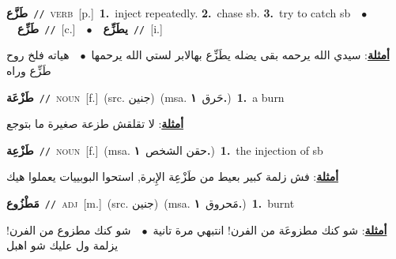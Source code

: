\documentclass[10pt,a4paper,twoside]{article} %
\begin{document}
\begin{multicols}{2}
{\setlength\topsep{0pt}\textbf{\foreignlanguage{arabic}{طَزَّع}}\ {\color{gray}\texttt{//}\color{black}}\ \textsc{verb}\ [p.]\ \textbf{1.}~inject repeatedly.  \textbf{2.}~chase sb.  \textbf{3.}~try to catch sb\ \ $\bullet$\ \ \setlength\topsep{0pt}\textbf{\foreignlanguage{arabic}{طَزِّع}}\ {\color{gray}\texttt{//}\color{black}}\ [c.]\ \ $\bullet$\ \ \setlength\topsep{0pt}\textbf{\foreignlanguage{arabic}{يطَزِّع}}\ {\color{gray}\texttt{//}\color{black}}\ [i.]\  \begin{flushright}\color{gray}\foreignlanguage{arabic}{\textbf{\underline{\foreignlanguage{arabic}{أمثلة}}}: سيدي الله يرحمه بقى يضله يطَزِّع بهالابر لستي الله يرحمها\ $\bullet$\ \  هياته فلخ روح طَزِّع وراه}\end{flushright}\color{black}} \vspace{2mm}

{\setlength\topsep{0pt}\textbf{\foreignlanguage{arabic}{طَزْعَة}}\ {\color{gray}\texttt{//}\color{black}}\ \textsc{noun}\ [f.]\ (src. \color{gray}\foreignlanguage{arabic}{جنين}\color{black})\ \color{gray}(msa. \foreignlanguage{arabic}{حَرق}~\foreignlanguage{arabic}{\textbf{١.}})\color{black}\ \textbf{1.}~a burn\  \begin{flushright}\color{gray}\foreignlanguage{arabic}{\textbf{\underline{\foreignlanguage{arabic}{أمثلة}}}: لا تقلقش طزعة صغيرة ما بتوجع}\end{flushright}\color{black}} \vspace{2mm}

{\setlength\topsep{0pt}\textbf{\foreignlanguage{arabic}{طَزْعِة}}\ {\color{gray}\texttt{//}\color{black}}\ \textsc{noun}\ [f.]\ \color{gray}(msa. \foreignlanguage{arabic}{حقن الشخص}~\foreignlanguage{arabic}{\textbf{١.}})\color{black}\ \textbf{1.}~the injection of sb\  \begin{flushright}\color{gray}\foreignlanguage{arabic}{\textbf{\underline{\foreignlanguage{arabic}{أمثلة}}}: فش زلمة كبير بعيط من طَزْعِة الإِبرة, استحوا البوبييات يعملوا هيك}\end{flushright}\color{black}} \vspace{2mm}

{\setlength\topsep{0pt}\textbf{\foreignlanguage{arabic}{مَطْزُوع}}\ {\color{gray}\texttt{//}\color{black}}\ \textsc{adj}\ [m.]\ (src. \color{gray}\foreignlanguage{arabic}{جنين}\color{black})\ \color{gray}(msa. \foreignlanguage{arabic}{مَحروق}~\foreignlanguage{arabic}{\textbf{١.}})\color{black}\ \textbf{1.}~burnt\  \begin{flushright}\color{gray}\foreignlanguage{arabic}{\textbf{\underline{\foreignlanguage{arabic}{أمثلة}}}: شو كنك مطزوعَة من الفرن! انتبهي مرة تانية\ $\bullet$\ \  شو كنك مطزوع من الفرن! يزلمة ول عليك شو اهبل}\end{flushright}\color{black}} \vspace{2mm}


\end{multicols}
\end{document}
